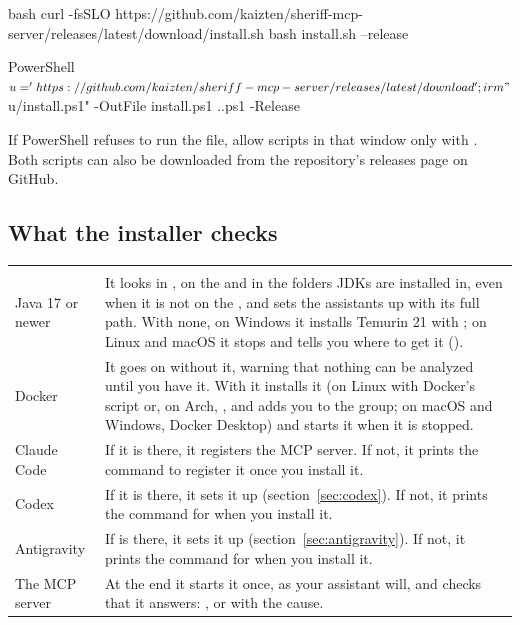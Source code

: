 \documentclass[11pt,a4paper]{article}
\begin{document}
\begin{command}[basicstyle=\ttfamily\scriptsize]{bash}
curl -fsSLO https://github.com/kaizten/sheriff-mcp-server/releases/latest/download/install.sh
bash install.sh --release
\end{command}

\begin{command}[basicstyle=\ttfamily\footnotesize]{PowerShell}
$u = 'https://github.com/kaizten/sheriff-mcp-server/releases/latest/download';
irm "$u/install.ps1" -OutFile install.ps1
.\install.ps1 -Release
\end{command}

If PowerShell refuses to run the file, allow scripts in that window only with
. Both scripts
can also be downloaded from the repository's releases page on GitHub.

\subsection{What the installer checks}

\begin{center}
\begin{tabularx}{\linewidth}{@{\hspace{6pt}}K{33mm}L}
\headrow {} &  \\
Java 17 or newer & It looks in , on the  and in
  the folders JDKs are installed in, even when it is not on the ,
  and sets the assistants up with its full path. With none, on Windows it
  installs Temurin 21 with ; on Linux and macOS it stops and tells
  you where to get it (). \\
Docker & It goes on without it, warning that nothing can be analyzed until you
  have it. With  it installs it (on Linux with Docker's
  script or, on Arch, , and adds you to the  group;
  on macOS and Windows, Docker Desktop) and starts it when it is stopped. \\
Claude Code & If it is there, it registers the MCP server. If not, it prints the
  command to register it once you install it. \\
Codex & If it is there, it sets it up (section~\ref{sec:codex}). If not, it
  prints the command for when you install it. \\
Antigravity & If  is there, it sets it up (section~\ref{sec:antigravity}).
  If not, it prints the command for when you install it. \\
The MCP server & At the end it starts it once, as your assistant will, and
  checks that it answers: , or  with the cause. \\
\end{tabularx}
\end{center}
\end{document}
